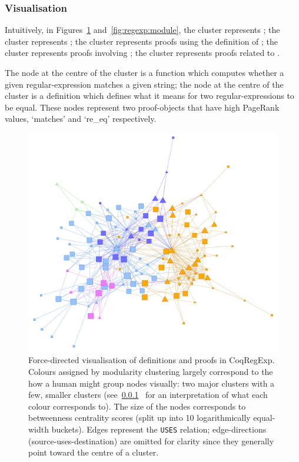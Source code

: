 \subsubsection{Visualisation}\label{subsubsec:visualisation}

Intuitively, in Figures~\ref{fig:regexp:direct} and~\ref{fig:regexp:module}, the
 cluster represents ; the
 cluster represents ; the
 cluster represents proofs using the definition of
; the  cluster represents proofs
involving ; the
 cluster represents proofs related to .

The node at the centre of the  cluster is a function which
computes whether a given regular-expression matches a given string; the node at
the centre of the  cluster is a definition which defines what it
means for two regular-expressions to be equal. These nodes represent two
proof-objects that have high PageRank values, `matches' and `re\_eq'
respectively.

\begin{figure}[tp]
\centering
\includegraphics[height=0.3\textheight]{img/regexp/direct.png}
\caption{Force-directed visualisation of definitions and proofs in CoqRegExp.
  Colours assigned by modularity clustering largely correspond to the how a
  human might group nodes visually: two major clusters with a few, smaller
  clusters (see~\ref{subsubsec:visualisation}~
  for an interpretation of what each colour corresponds to). The size of the
  nodes corresponds to betweenness centrality scores (split up into 10
  logarithmically equal-width buckets). Edges represent the \texttt{USES}
  relation; edge-directions (source-uses-destination) are omitted for clarity
  since they generally point toward the centre of a
  cluster.}\label{fig:regexp:direct}
\end{figure}

